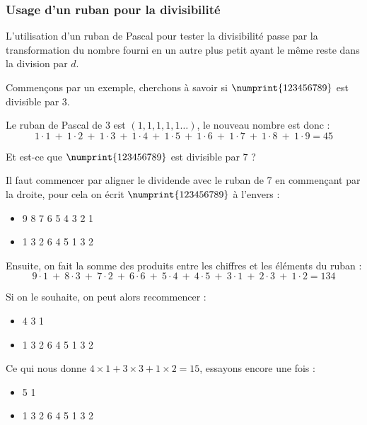 \documentclass[a4paper]{article}
\begin{document}
\vfill



\subsubsection*{Usage d’un ruban pour la divisibilité}\label{usage_ruban}
	L'utilisation d'un ruban de Pascal pour tester la divisibilité passe par la transformation du nombre fourni en un autre plus petit ayant le même reste dans la division par $d$.
	
	Commençons par un exemple, cherchons à savoir si $\numprint{123456789}$ est divisible par $3$.
	
	Le ruban de Pascal de $3$ est $(1, 1, 1, 1, 1\dots)$, le nouveau nombre est donc :
	\vspace{-1 mm}
	$$1 \cdot 1~+~1 \cdot 2~+~1 \cdot 3~+~1 \cdot 4~+~1 \cdot 5~+~1 \cdot 6~+~1 \cdot 7~+~1 \cdot 8~+~1 \cdot 9 = 45$$

\vfill

\pagebreak




	Et est-ce que $\numprint{123456789}$ est divisible par $7$ ?
	
	Il faut commencer par aligner le dividende avec le ruban de 7 en commençant par la droite, pour cela on écrit $\numprint{123456789}$ à l'envers :
	
\begin{itemize}
	\item[] 9 8 7 6 5 4 3 2 1 
    \item[] 1 3 2 6 4 5 1 3 2
\end{itemize}	
	
    
Ensuite, on fait la somme des produits entre les chiffres et les éléments du ruban :
$$9 \cdot 1~+~8 \cdot 3~+~7 \cdot 2~+~6 \cdot 6~+~5 \cdot 4~+~4 \cdot 5~+~3 \cdot 1~+~2 \cdot 3~+~1 \cdot 2 = 134$$

Si on le souhaite, on peut alors recommencer :

\begin{itemize}
	\item[] 4 3 1 
    \item[] 1 3 2 6 4 5 1 3 2\\
\end{itemize}

Ce qui nous donne $ 4×1 + 3×3 + 1×2 = 15 $, essayons encore une fois :

\begin{itemize}
	\item[] 5 1
    \item[] 1 3 2 6 4 5 1 3 2\\
\end{itemize}
\end{document}
